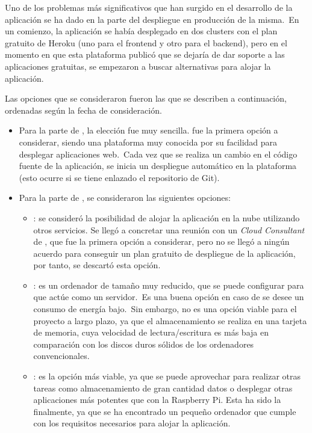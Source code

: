 Uno de los problemas más significativos que han surgido en el desarrollo de la aplicación se ha dado en la parte del
despliegue en producción de la misma.\ En un comienzo, la aplicación se había desplegado en dos clusters con el plan
gratuito de Heroku (uno para el frontend y otro para el backend), pero en el momento en que esta plataforma publicó
que se dejaría de dar soporte a las aplicaciones gratuitas, se empezaron a buscar alternativas para alojar la
aplicación.

Las opciones que se consideraron fueron las que se describen a continuación, ordenadas según la fecha de consideración.

\begin{itemize}
	\item Para la parte de , la elección fue muy sencilla.  fue la primera opción
	a considerar, siendo una plataforma muy conocida por su facilidad para desplegar aplicaciones web.\ Cada vez que se
	realiza un cambio en el código fuente de la aplicación, se inicia un despliegue automático en la plataforma (esto
	ocurre si se tiene enlazado el repositorio de Git).

	\item Para la parte de , se consideraron las siguientes opciones:
	\begin{itemize}
		\item {}: se consideró la posibilidad de alojar la aplicación en la nube
		utilizando otros servicios.
		Se llegó a concretar una reunión con un \textit{Cloud Consultant} de , que
		fue la primera opción a considerar, pero no se llegó a ningún acuerdo para conseguir un plan gratuito de
		despliegue de la aplicación, por tanto, se descartó esta opción.

		\item {}: es un ordenador de tamaño muy reducido, que se puede configurar para que
		actúe como un
		servidor.\ Es una buena opción en caso de se desee un consumo de energía bajo.\ Sin embargo, no es una opción
		viable para el proyecto a largo plazo, ya que el almacenamiento se realiza en una tarjeta de memoria, cuya
		velocidad de lectura/escritura es más baja en comparación con los discos duros sólidos de los ordenadores
		convencionales.

		\item {}: es la opción más viable, ya que se puede aprovechar para realizar otras
		tareas como
		almacenamiento de gran cantidad datos o desplegar otras aplicaciones más potentes que con la Raspberry Pi.
		Esta ha sido la  finalmente, ya que se ha encontrado un pequeño ordenador que cumple
		con los requisitos necesarios para alojar la aplicación.
	\end{itemize}
\end{itemize}

